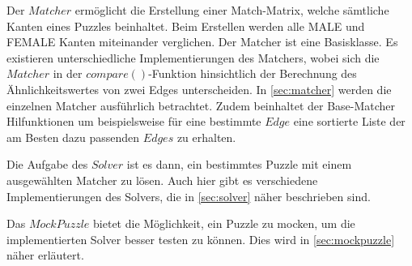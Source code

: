 Der $Matcher$ ermöglicht die Erstellung einer Match-Matrix, welche sämtliche Kanten eines Puzzles beinhaltet. Beim Erstellen werden alle MALE und FEMALE Kanten miteinander verglichen. 
Der Matcher ist eine Basisklasse. Es existieren unterschiedliche Implementierungen des Matchers, wobei sich die $Matcher$ in der $compare()$-Funktion hinsichtlich der Berechnung des Ähnlichkeitswertes von zwei Edges unterscheiden.
In \autoref{sec:matcher} werden die einzelnen Matcher ausführlich betrachtet.
Zudem beinhaltet der Base-Matcher Hilfunktionen um beispielsweise für eine bestimmte $Edge$ eine sortierte Liste der am Besten dazu passenden $Edges$ zu erhalten.

Die Aufgabe des $Solver$ ist es dann, ein bestimmtes Puzzle mit einem ausgewählten Matcher zu lösen. Auch hier gibt es verschiedene Implementierungen des Solvers, die in \autoref{sec:solver} näher beschrieben sind.

Das $MockPuzzle$ bietet die Möglichkeit, ein Puzzle zu mocken, um die implementierten Solver besser testen zu können. Dies wird in \autoref{sec:mockpuzzle} näher erläutert.
